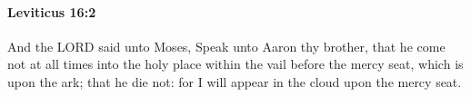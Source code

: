 
		\paragraph{Leviticus 16:2} %
			\label{LEVITICUS-16-2}

			And the LORD said unto Moses, Speak unto Aaron thy brother, that he come not at all times into the holy place within the vail before the mercy seat, which is upon the ark; that he die not: for I will appear in the cloud upon the mercy seat.


